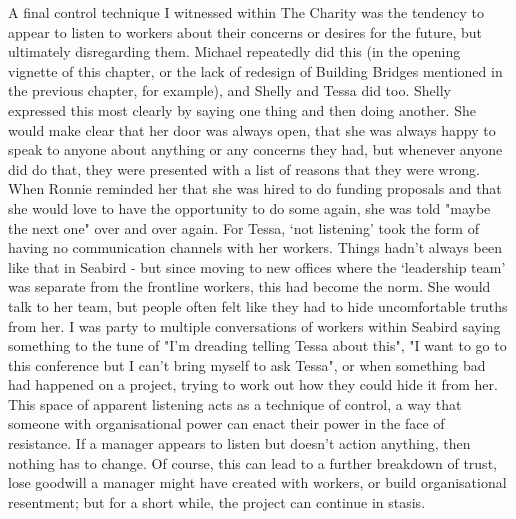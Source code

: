 A final control technique I witnessed within The Charity was the tendency to appear to listen to workers about their concerns or desires for the future, but ultimately disregarding them. Michael repeatedly did this (in the opening vignette of this chapter, or the lack of redesign of Building Bridges mentioned in the previous chapter, for example), and Shelly and Tessa did too. Shelly expressed this most clearly by saying one thing and then doing  another. She would make clear that her door was always open, that she was always happy to speak to anyone about anything or any concerns they had, but whenever anyone did do that, they were presented with a list of reasons that they were wrong. When Ronnie reminded her that she was hired to do funding proposals and that she would love to have the opportunity to do some again, she was told "maybe the next one" over and over again. For Tessa, ‘not listening’ took the form of having no communication channels with her workers. Things hadn’t always been like that in Seabird - but since moving to new offices where the ‘leadership team’ was separate from the frontline workers, this had become the norm. She would talk to her team, but people often felt like they had to hide uncomfortable truths from her. I was party to multiple conversations of workers within Seabird saying something to the tune of "I'm dreading telling Tessa about this", "I want to go to this conference but I can't bring myself to ask Tessa", or when something bad had happened on a project, trying to work out how they could hide it from her. This space of apparent listening acts as a technique of control, a way that someone with organisational power can enact their power in the face of resistance. If a manager appears to listen but doesn't action anything, then nothing has to change. Of course, this can lead to a further breakdown of trust, lose goodwill a manager might have created with workers, or build organisational resentment; but for a short while, the project can continue in stasis. 

